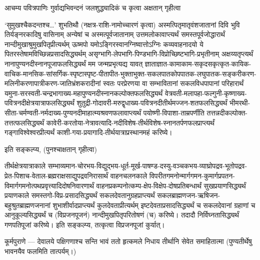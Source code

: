 
आचम्य पवित्रपाणिः गुर्वाद्यभिवन्दनं जलशुद्ध्यादिकं च कृत्वा अक्षतान् गृहीत्वा


`सुमुखश्चैकदन्तश्च\ldots' शुभतिथौ (नक्षत्र-राशि-नामोच्चारणं कृत्वा)
अस्मत्पितृमातृवंशजातानां दिवि भुवि तिर्यङ्नरकादिषु वासिनाम् अन्येषां च
अस्मत्पूर्वजातानाम् उत्तमलोकावाप्त्यर्थं समस्तपूर्वजोद्धारार्थं नान्दीमुखाश्रुमुखपितृप्रीत्यर्थम्
ऊष्मपो यमोऽङ्गिरस्वानग्निष्वात्तोऽग्निः कव्यवाहनादयो ये पितरस्तेषामविच्छिन्नप्रसादसिद्ध्यर्थम्
असृग्भागि-लेपभागि-पिण्डभागि-विप्रोच्छिष्टभागि-प्रभृतीनाम् अक्षय्यतृप्त्यर्थं
नानापुण्यनदीस्नानपूजाफलसिद्ध्यर्थं मम जन्मप्रभृत्यद्य यावत्
ज्ञाताज्ञात-कामाकाम-सकृदसकृत्कृत-कायिक-वाचिक-मानसिक-सांसर्गिक-स्पृष्टास्पृष्ट-पीतापीत-भुक्ताभुक्त-सकलपातकोपपातक-लघुपातक-सङ्करीकरण-मलिनीकरणापात्रीकरण-जातिभ्रंशकरादीनां
स्वतः परप्रेरणया वा सम्भावितानां सकलविधपापानां परिहारार्थं
यमुना-सरस्वती-चन्द्रभागाख्य-महापुण्यनदीस्नानकल्पोक्तफलसिद्ध्यर्थं
वेत्रवती-मलापहा-फल्गुनी-कृष्णाख्य-पवित्रनदीक्षेत्रयात्राफलसिद्ध्यर्थं
शुतुद्री-गोदावरी-मरुद्वृधाख्य-पवित्रनदीतीर्थमज्जन-शतफलसिद्ध्यर्थं
भीमरथी-सीता-चर्मण्वती-नर्मदाख्य-पुण्यनदीमाहात्म्यश्रवणफलावाप्त्यर्थं
पयोष्णी-विपाशा-ताम्रपर्णीति तत्तन्नदीकल्पोक्त-तत्तत्फलसिद्ध्यर्थं
कावेरी-करतोया-नेत्रावत्यादि-नदीविशेष-तीर्थविशेष-स्नानतर्पणफलप्राप्त्यर्थं
गङ्गाविश्वेश्वरप्रीत्यर्थं काशी-गया-प्रयागादि-तीर्थयात्राप्रस्थानमहं करिष्ये।

इति सङ्कल्प्य, (पुनश्चाक्षतान् गृहीत्वा)

तीर्थक्षेत्रयात्राकाले सम्भाव्यमान-चोरभय-विद्युद्भय-धूर्त-मूर्ख-पाषण्ड-दस्यु-वञ्चकभय-व्याघ्रोपद्रव-भूतोपद्रव-प्रेत-पिशाच-वेताल-ब्रह्मराक्षसाद्युपद्रवनिरासार्थं
वाहनचलनकाले विपरीतगमनोन्मार्गगमन-कुमार्गप्रपतन-विमार्गगमनोत्पथप्रवृत्त्यादिदोषनिवारणार्थं
वाहनप्रकम्पनोत्कम्प-क्षेप-विक्षेप-दोषप्रतिबन्धार्थं सुखप्रयाणसिद्ध्यर्थं प्रयाणकाले
समस्तगो-विप्र-प्रसादसिद्ध्यर्थं सकलदेवतानुग्रहप्राप्त्यर्थं सकलब्राह्मणजन-ऋषिजन-बहुश्रुतब्राह्मणजनानां
शुभाशीर्वादप्राप्त्यर्थं कुलदेवताप्रीत्यर्थम् इष्टदेवताप्रसादसिद्ध्यर्थं च सकलदेवानां
ग्रहाणां च आनुकूल्यसिद्ध्यर्थं च (विप्रजनपूजनं) नान्दीमुखपितृपरितोषणं (च) करिष्ये।
तदादौ निर्विघ्नतासिद्ध्यर्थं गणपतिपूजां करिष्ये। इति सङ्कल्प्य, तत्कृत्वा विप्रजनपूजां कुर्यात्।

{\small कूर्मपुराणे —
{देवालये पक्षिगणाश्च सन्ति}
{भावं ततो हृत्कमले निधाय}
{तीर्थानि सेवेत समाहितात्मा}
(पुण्यतीर्थेषु भावनयैव फलमिति तात्पर्यम्।)\par}

